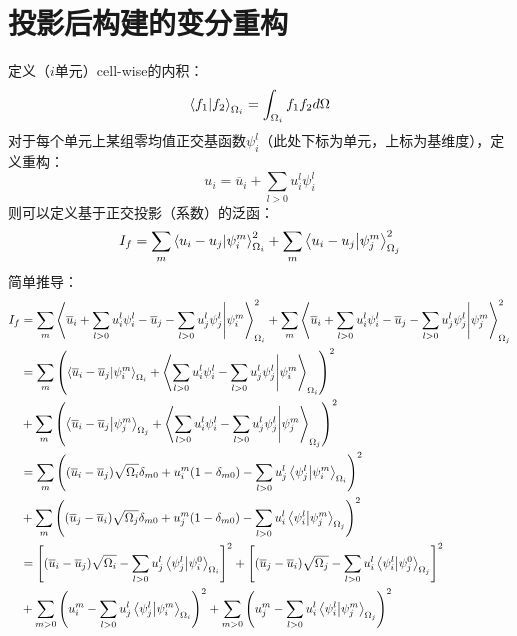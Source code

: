 \documentclass[UTF8,zihao=5]{ctexart} %
\newcommand*{\mean}[1]{\overline{#1}}
\begin{document}
\section{投影后构建的变分重构}

定义（$i$单元）cell-wise的内积：
$$
    \innerproduct{f_1}{f_2}_{\Omega_i}=\int_{\Omega_i}{f_1f_2d\Omega}
$$
对于每个单元上某组零均值正交基函数$\psi_i^l$（此处下标为单元，上标为基维度），定义重构：
$$
    u_i=\mean{u}_i + \sum_{l>0}{u_i^l\psi_i^l}
$$
则可以定义基于正交投影（系数）的泛函：
$$
    I_f=
    \sum_{m}
    {
        \innerproduct{u_i-u_j}{\psi_i^m}_{\Omega_i}^2
    }
    +
    \sum_{m}
    {
        \innerproduct{u_i-u_j}{\psi_j^m}_{\Omega_j}^2
    }
$$
简单推导：
$$
    \begin{aligned}
        I_f & =
        \sum_{m}
        {
            \innerproduct{\mean{u}_i + \sum_{l>0}{u_i^l\psi_i^l} - \mean{u}_j - \sum_{l>0}{u_j^l\psi_j^l} }{\psi_i^m}_{\Omega_i}^2
        }
        +
        \sum_{m}
        {
            \innerproduct{\mean{u}_i + \sum_{l>0}{u_i^l\psi_i^l} - \mean{u}_j - \sum_{l>0}{u_j^l\psi_j^l} }{\psi_j^m}_{\Omega_j}^2
        }          \\
            & =
        \sum_{m}
        {\left(
            \innerproduct{\mean{u}_i - \mean{u}_j}{\psi_i^m}_{\Omega_i}
            +
            \innerproduct{\sum_{l>0}{u_i^l\psi_i^l} - \sum_{l>0}{u_j^l\psi_j^l} }{\psi_i^m}_{\Omega_i}
            \right)^2}
        \\
            & +
        \sum_{m}
        {\left(
            \innerproduct{\mean{u}_i - \mean{u}_j}{\psi_j^m}_{\Omega_j}
            +
            \innerproduct{\sum_{l>0}{u_i^l\psi_i^l} - \sum_{l>0}{u_j^l\psi_j^l} }{\psi_j^m}_{\Omega_j}
        \right)^2} \\
            & =
        \sum_{m}
        {\left(
            (\mean{u}_i - \mean{u}_j)\sqrt{\Omega_i}\delta_{m0}
            +
            u_i^m(1-\delta_{m0})
            - \sum_{l>0}u_j^l\innerproduct{\psi_j^l}{\psi_i^m}_{\Omega_i}
            \right)^2}
        \\
            & +
        \sum_{m}
        {\left(
            (\mean{u}_j - \mean{u}_i)\sqrt{\Omega_j}\delta_{m0}
            +
            u_j^m(1-\delta_{m0})
            - \sum_{l>0}u_i^l\innerproduct{\psi_i^l}{\psi_j^m}_{\Omega_j}
        \right)^2} \\
            & =
        \left[
            (\mean{u}_i - \mean{u}_j)\sqrt{\Omega_i}
            - \sum_{l>0}u_j^l\innerproduct{\psi_j^l}{\psi_i^0}_{\Omega_i}
            \right]^2
        +
        \left[
            (\mean{u}_j - \mean{u}_i)\sqrt{\Omega_j}
            - \sum_{l>0}u_i^l\innerproduct{\psi_i^l}{\psi_j^0}_{\Omega_j}
        \right]^2  \\
            & +
        \sum_{m>0}
        {\left(
            u_i^m
            - \sum_{l>0}u_j^l\innerproduct{\psi_j^l}{\psi_i^m}_{\Omega_i}
            \right)^2}
        +
        \sum_{m>0}
        {\left(
            u_j^m
            - \sum_{l>0}u_i^l\innerproduct{\psi_i^l}{\psi_j^m}_{\Omega_j}
        \right)^2} \\
    \end{aligned}
$$
\end{document}
